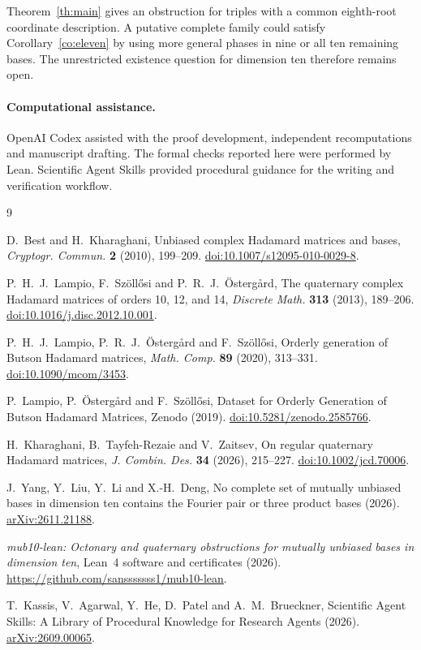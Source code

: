 \documentclass[11pt]{article}
\begin{document}
Theorem~\ref{th:main} gives an obstruction for triples with a common
eighth-root coordinate description. A putative complete family could
satisfy Corollary~\ref{co:eleven} by using more general phases in nine
or all ten remaining bases. The unrestricted existence question for
dimension ten therefore remains open.

\paragraph{Computational assistance.}
OpenAI Codex assisted with the proof development, independent
recomputations and manuscript drafting. The formal checks reported here
were performed by Lean. Scientific Agent Skills \cite{skills} provided
procedural guidance for the writing and verification workflow.

\begin{thebibliography}{9}
\raggedright
{}
D.~Best and H.~Kharaghani,
Unbiased complex Hadamard matrices and bases,
\emph{Cryptogr. Commun.} \textbf{2} (2010), 199--209.
\href{https://doi.org/10.1007/s12095-010-0029-8}{doi:10.1007/s12095-010-0029-8}.

P.~H.~J.~Lampio, F.~Sz\"oll\H{o}si and P.~R.~J.~\"Osterg{\aa}rd,
The quaternary complex Hadamard matrices of orders 10, 12, and 14,
\emph{Discrete Math.} \textbf{313} (2013), 189--206.
\href{https://doi.org/10.1016/j.disc.2012.10.001}{doi:10.1016/j.disc.2012.10.001}.

P.~H.~J.~Lampio, P.~R.~J.~\"Osterg{\aa}rd and F.~Sz\"oll\H{o}si,
Orderly generation of Butson Hadamard matrices,
\emph{Math. Comp.} \textbf{89} (2020), 313--331.
\href{https://doi.org/10.1090/mcom/3453}{doi:10.1090/mcom/3453}.

P.~Lampio, P.~\"Osterg{\aa}rd and F.~Sz\"oll\H{o}si,
Dataset for Orderly Generation of Butson Hadamard Matrices, Zenodo (2019).
\href{https://doi.org/10.5281/zenodo.2585766}{doi:10.5281/zenodo.2585766}.

H.~Kharaghani, B.~Tayfeh-Rezaie and V.~Zaitsev,
On regular quaternary Hadamard matrices, \emph{J. Combin. Des.}
\textbf{34} (2026), 215--227.
\href{https://doi.org/10.1002/jcd.70006}{doi:10.1002/jcd.70006}.

J.~Yang, Y.~Liu, Y.~Li and X.-H.~Deng,
No complete set of mutually unbiased bases in dimension ten contains the
Fourier pair or three product bases (2026).
\href{https://arxiv.org/abs/2611.21188}{arXiv:2611.21188}.

\emph{mub10-lean: Octonary and quaternary obstructions for mutually
unbiased bases in dimension ten}, Lean~4 software and certificates (2026).
\url{https://github.com/sansssssss1/mub10-lean}.

T.~Kassis, V.~Agarwal, Y.~He, D.~Patel and A.~M.~Brueckner,
Scientific Agent Skills: A Library of Procedural Knowledge for Research
Agents (2026).
\href{https://arxiv.org/abs/2609.00065}{arXiv:2609.00065}.
\end{thebibliography}
\end{document}
